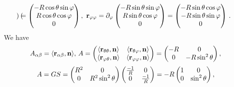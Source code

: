 \documentclass[12pt]{article}
\theoremstyle{theorem}
\numberwithin{equation}{section}
\begin{document}
{$$\begin{pmatrix}
   \end{pmatrix}=\begin{pmatrix}
        -R\cos\theta\sin\varphi\\
        R\cos\theta\cos\varphi\\
          0\\
   \end{pmatrix},\,\,
   {\bf r}_{\varphi \varphi}=\partial_\varphi
       \begin{pmatrix}
        -R\sin\theta\sin\varphi\\
          R\sin\theta\cos\varphi\\
          0\\
   \end{pmatrix}=\begin{pmatrix}
        -R\sin\theta\cos\varphi\\
        -R\sin\theta\sin\varphi\\
          0\\
   \end{pmatrix}\,.
                      $$
We have
                    \begin{equation}\label{secquadrformforcylinder}
            A_{\alpha\beta}=\langle{\bf r}_{\alpha\beta},{\bf n}\rangle,\,
              A=\begin{pmatrix}\langle{\bf r}_{\theta\theta},{\bf n}\rangle&\langle{\bf r}_{\theta\varphi},{\bf n}\rangle\cr
                               \langle{\bf r}_{\varphi \theta},{\bf n}\rangle &\langle{\bf r}_{\varphi\varphi},{\bf n}\rangle\cr
                                   \end{pmatrix}=
                                   \begin{pmatrix}-R&0\cr
                                0&-R\sin^2\theta\cr
                                   \end{pmatrix},
                    \end{equation}
                    $$
       A=GS=\begin{pmatrix}R^2&0\cr
                                0&R^2\sin^2\theta\cr
                                   \end{pmatrix}
                                   \begin{pmatrix}{-1\over R}&0\cr
                                0&{-1\over R}\cr
                                   \end{pmatrix}=
                                       -R
                                  \begin{pmatrix}1&0\cr
                                0&\sin^2\theta\cr
                                   \end{pmatrix},
$$}
\end{document}
